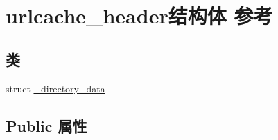 \hypertarget{structurlcache__header}{}\section{urlcache\+\_\+header结构体 参考}
\label{structurlcache__header}
\subsection*{类}
\begin{DoxyCompactItemize}
\item 
struct \hyperlink{structurlcache__header_1_1__directory__data}{\+\_\+directory\+\_\+data}
\end{DoxyCompactItemize}
\subsection*{Public 属性}
